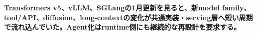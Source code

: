 \noindent\textbf{Transformers v5、vLLM、SGLangの1月更新を見ると、新model family、tool/API、diffusion、long-contextの変化が共通実装・serving層へ短い周期で流れ込んでいた。Agent化はruntime側にも継続的な再設計を要求する。}\autocite{src-152188dd686e,src-3bc80a3c7870,src-6a97353d35a9}

